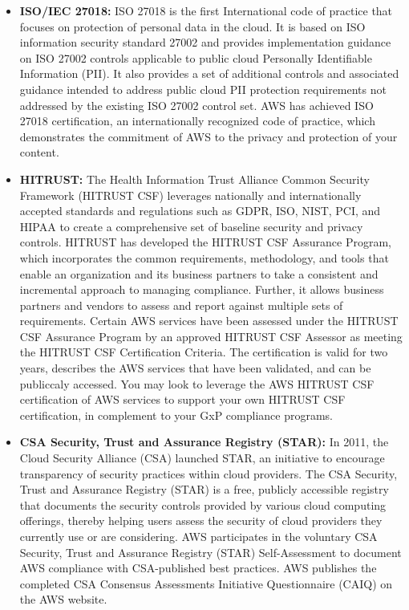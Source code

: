 \begin{itemize}
    \item \textbf{ISO/IEC 27018: } ISO 27018 is the first International code of practice that focuses on protection of personal data in the cloud. It is based on ISO information security standard 27002 and provides implementation guidance on ISO 27002 controls applicable to public cloud Personally Identifiable Information (PII). It also provides a set of additional controls and associated guidance intended to address public cloud PII protection requirements not addressed by the existing ISO 27002 control set. AWS has achieved ISO 27018 certification, an internationally recognized code of practice, which demonstrates the commitment of AWS to the privacy and protection of your content.
    \item \textbf{HITRUST: } The Health Information Trust Alliance Common Security Framework (HITRUST CSF) leverages nationally and internationally accepted standards and regulations such as GDPR, ISO, NIST, PCI, and HIPAA to create a comprehensive set of baseline security and privacy controls. HITRUST has developed the HITRUST CSF Assurance Program, which incorporates the common requirements, methodology, and tools that enable an organization and its business partners to take a consistent and incremental approach to managing compliance. Further, it allows business partners and vendors to assess and report against multiple sets of requirements. Certain AWS services have been assessed under the HITRUST CSF Assurance Program by an approved HITRUST CSF Assessor as meeting the HITRUST CSF Certification Criteria. The certification is valid for two years, describes the AWS services that have been validated, and can be publiccaly accessed. You may look to leverage the AWS HITRUST CSF certification of AWS services to support your own HITRUST CSF certification, in complement to your GxP compliance programs.
    \item \textbf{CSA Security, Trust and Assurance Registry (STAR): } In 2011, the Cloud Security Alliance (CSA) launched STAR, an initiative to encourage transparency of security practices within cloud providers. The CSA Security, Trust and Assurance Registry (STAR) is a free, publicly accessible registry that documents the security controls provided by various cloud computing offerings, thereby helping users assess the security of cloud providers they currently use or are considering. AWS participates in the voluntary CSA Security, Trust and Assurance Registry (STAR) Self-Assessment to document AWS compliance with CSA-published best practices. AWS publishes the completed CSA Consensus Assessments Initiative Questionnaire (CAIQ) on the AWS website.
\end{itemize}

